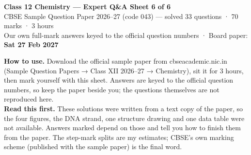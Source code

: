 \documentclass[10pt,a4paper]{extarticle}
\def\sheetname{Expert Q\&A}
\begin{document}
\gdef\sheetname{Expert Q\&A Sheet 6 of 6: CBSE Sample Paper 2026--27 solved}
\begin{tcolorbox}[enhanced,colback=navy,colframe=navy,arc=2pt,left=8pt,right=8pt,top=5pt,bottom=5pt]
\color{white}\sffamily
{\LARGE\bfseries Class 12 Chemistry — Expert Q\&A Sheet 6 of 6}\\[3pt]
{\large CBSE Sample Question Paper 2026--27 (code 043) — solved} \hfill {\small 33 questions · 70 marks · 3 hours}\\[2pt]
{\footnotesize Our own full-mark answers keyed to the official question numbers · Board paper: \textbf{Sat 27 Feb 2027}}
\end{tcolorbox}
\begin{tcolorbox}[enhanced,colback=tipY,colframe=tipYframe,boxrule=0.5pt,arc=1.5pt,left=4pt,right=4pt,top=1.5pt,bottom=1.5pt,before skip=3pt,after skip=3pt]
\footnotesize\textbf{How to use.} Download the official sample paper from cbseacademic.nic.in (Sample Question Papers → Class XII 2026--27 → Chemistry), sit it for 3 hours, then mark yourself with this sheet. Answers are keyed to the official question numbers, so keep the paper beside you; the questions themselves are not reproduced here.\\
\textbf{Read this first.} These solutions were written from a text copy of the paper, so the four figures, the DNA strand, one structure drawing and one data table were not available. Answers marked  depend on those and tell you how to finish them from the paper. The step-mark splits are my estimates; CBSE's own marking scheme (published with the sample paper) is the final word.
\end{tcolorbox}
\end{document}

